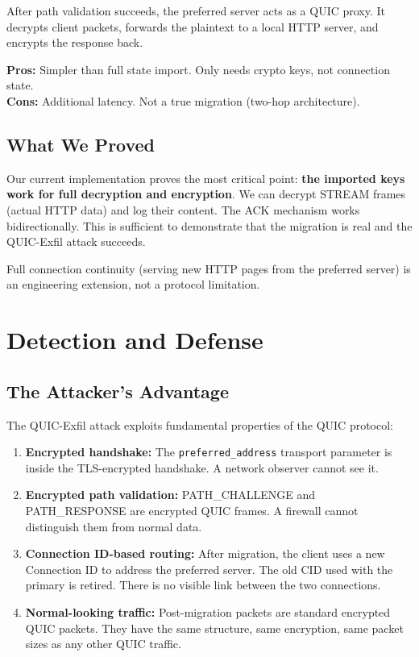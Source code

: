 \documentclass[11pt,a4paper]{article}
\begin{document}
After path validation succeeds, the preferred server acts as a QUIC proxy. It decrypts client packets, forwards the plaintext to a local HTTP server, and encrypts the response back.

\textbf{Pros:} Simpler than full state import. Only needs crypto keys, not connection state.\\
\textbf{Cons:} Additional latency. Not a true migration (two-hop architecture).

\subsection{What We Proved}

Our current implementation proves the most critical point: \textbf{the imported keys work for full decryption and encryption}. We can decrypt STREAM frames (actual HTTP data) and log their content. The ACK mechanism works bidirectionally. This is sufficient to demonstrate that the migration is real and the QUIC-Exfil attack succeeds.

Full connection continuity (serving new HTTP pages from the preferred server) is an engineering extension, not a protocol limitation.

\newpage
\section{Detection and Defense}

\subsection{The Attacker's Advantage}

The QUIC-Exfil attack exploits fundamental properties of the QUIC protocol:

\begin{enumerate}
    \item \textbf{Encrypted handshake:} The \texttt{preferred\_address} transport parameter is inside the TLS-encrypted handshake. A network observer cannot see it.

    \item \textbf{Encrypted path validation:} PATH\_CHALLENGE and PATH\_RESPONSE are encrypted QUIC frames. A firewall cannot distinguish them from normal data.

    \item \textbf{Connection ID-based routing:} After migration, the client uses a new Connection ID to address the preferred server. The old CID used with the primary is retired. There is no visible link between the two connections.

    \item \textbf{Normal-looking traffic:} Post-migration packets are standard encrypted QUIC packets. They have the same structure, same encryption, same packet sizes as any other QUIC traffic.
\end{enumerate}
\end{document}
